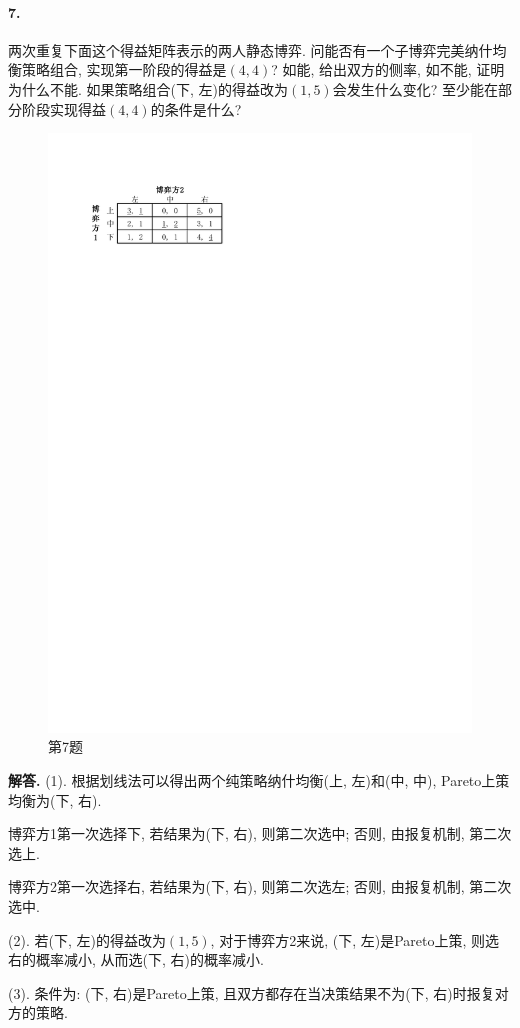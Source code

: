 \documentclass[12pt, a4paper, oneside]{ctexart}
\newenvironment{solution}{\par\noindent\textbf{解答. }}{\bigskip\par}
\begin{document}
\paragraph{7.}两次重复下面这个得益矩阵表示的两人静态博弈. 问能否有一个子博弈完美纳什均衡策略组合, 实现第一阶段的得益是$(4,4)$? 如能, 给出双方的侧率, 如不能, 证明为什么不能. 如果策略组合(下, 左)的得益改为$(1,5)$会发生什么变化? 至少能在部分阶段实现得益$(4,4)$的条件是什么?
\begin{figure}[htbp]
    \centering
    \includegraphics[scale=1]{Economic4.7.pdf}
    \caption{第7题}
\end{figure}
\begin{solution}
    (1). 根据划线法可以得出两个纯策略纳什均衡(上, 左)和(中, 中), Pareto上策均衡为(下, 右).
    
    博弈方1第一次选择下, 若结果为(下, 右), 则第二次选中; 否则, 由报复机制, 第二次选上.

    博弈方2第一次选择右, 若结果为(下, 右), 则第二次选左; 否则, 由报复机制, 第二次选中.

    (2). 若(下, 左)的得益改为$(1, 5)$, 对于博弈方2来说, (下, 左)是Pareto上策, 则选右的概率减小, 从而选(下, 右)的概率减小.

    (3). 条件为: (下, 右)是Pareto上策, 且双方都存在当决策结果不为(下, 右)时报复对方的策略.
\end{solution}
\end{document}
